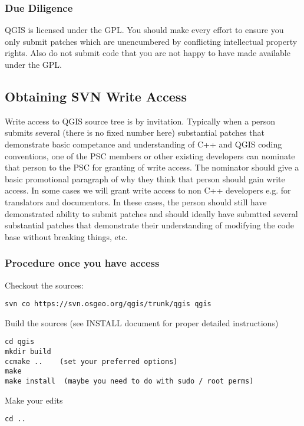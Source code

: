 \subsubsection{Due Diligence}
QGIS is licensed under the GPL. You should make every effort to ensure you only
submit patches which are unencumbered by conflicting intellectual property
rights. Also do not submit code that you are not happy to have made available
under the GPL.

\subsection{Obtaining SVN Write Access}
Write access to QGIS source tree is by invitation. Typically when a person
submits several (there is no fixed number here) substantial patches that
demonstrate basic competance and understanding of C++ and QGIS coding
conventions, one of the PSC members or other existing developers can nominate
that person to the PSC for granting of write access. The nominator should give
a basic promotional paragraph of why they think that person should gain write
access. In some cases we will grant write access to non C++ developers e.g. for
translators and documentors.  In these cases, the person should still have
demonstrated ability to submit patches and should ideally have submtted several
substantial patches that demonstrate their understanding of modifying the code
base without breaking things, etc.

\subsubsection{Procedure once you have access}
Checkout the sources:

\begin{verbatim}
svn co https://svn.osgeo.org/qgis/trunk/qgis qgis
\end{verbatim}

Build the sources (see INSTALL document for proper detailed instructions)

\begin{verbatim}
cd qgis
mkdir build
ccmake ..    (set your preferred options)
make
make install  (maybe you need to do with sudo / root perms)
\end{verbatim}

Make your edits

\begin{verbatim}
cd ..
\end{verbatim}

